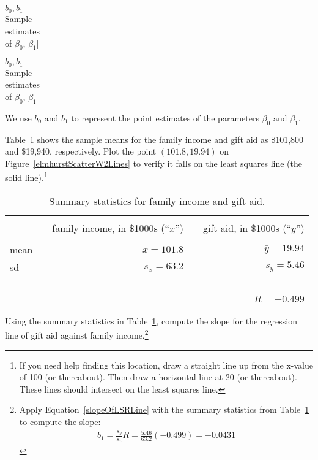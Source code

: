 $b_0, b_1$\vspace{0.5mm}\\\footnotesize Sample\\estimates\\ of $\beta_0$, $\beta_1$]{\raggedright\vspace{0.5mm}

$b_0, b_1$\vspace{0.5mm}\\\footnotesize Sample\\estimates\\ of $\beta_0$, $\beta_1$}We use $b_0$ and $b_1$ to represent the point estimates of the parameters $\beta_0$ and $\beta_1$.

\begin{exercise}
Table~\ref{summaryStatsOfSATGPAData} shows the sample means for the family income and gift aid as \$101,800 and \$19,940, respectively. Plot the point $(101.8, 19.94)$ on Figure~\vref{elmhurstScatterW2Lines} to verify it falls on the least squares line (the solid line).\footnote{If you need help finding this location, draw a straight line up from the x-value of 100 (or thereabout). Then draw a horizontal line at 20 (or thereabout). These lines should intersect on the least squares line.}
\end{exercise}

\begin{table}[ht]
\centering
\begin{tabular}{l rr}
\hline
\vspace{-4mm} & & \\
\vspace{0.4mm}	&	\ \ family income, in \$1000s (``$x$'')	& \ \ gift aid, in \$1000s (``$y$'') \\
\hline
  \vspace{-3.9mm} & & \\
mean	& $\bar{x} = 101.8$		& $\bar{y} = 19.94$ \\
sd		& $s_x = 63.2$		& $s_y = 5.46$\vspace{0.4mm} \\
\hline
\vspace{-4mm}\ &\\
	& \multicolumn{2}{r}{$R=-0.499$} \\
\hline
\end{tabular}
\caption{Summary statistics for family income and gift aid.}
\label{summaryStatsOfSATGPAData}
\end{table}

\begin{exercise} \label{findingTheSlopeOfTheLSRLineForIncomeAndAid}
Using the summary statistics in Table~\ref{summaryStatsOfSATGPAData}, compute the slope for the regression line of gift aid against family income.\footnote{Apply Equation~\eqref{slopeOfLSRLine} with the summary statistics from Table~\ref{summaryStatsOfSATGPAData} to compute the slope:
\begin{eqnarray*}
b_1 = \frac{s_y}{s_x} R = \frac{5.46}{63.2}(-0.499) = -0.0431
\end{eqnarray*}\vspace{-3mm}}
\end{exercise}

